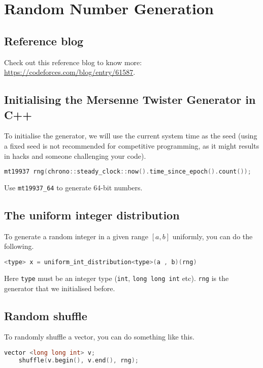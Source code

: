 \documentclass[12pt,a4paper]{amsart}
\numberwithin{equation}{section}
\theoremstyle{definition}
\begin{document}
\section{Random Number Generation}
\subsection{Reference blog} Check out this reference blog to know more: \url{https://codeforces.com/blog/entry/61587}. 

\subsection{Initialising the Mersenne Twister Generator in C++} To initialise the generator, we will use the current system time as the seed (using a fixed seed is not recommended for competitive programming, as it might results in hacks and someone challenging your code). 
\begin{lstlisting}[language=C++]
    mt19937 rng(chrono::steady_clock::now().time_since_epoch().count());
\end{lstlisting}
Use \verb|mt19937_64| to generate 64-bit numbers. 

\subsection{The uniform integer distribution} To generate a random integer in a given range $[a , b]$ uniformly, you can do the following. 
\begin{lstlisting}[language=C++]
    <type> x = uniform_int_distribution<type>(a , b)(rng)
\end{lstlisting}
Here \verb|type| must be an integer type (\verb|int|, \verb|long long int| etc). \verb|rng| is the generator that we initialised before. 

\subsection{Random shuffle} To randomly shuffle a vector, you can do something like this. 
\begin{lstlisting}[language=C++]
    vector <long long int> v;
    shuffle(v.begin(), v.end(), rng);
\end{lstlisting}
\end{document}
